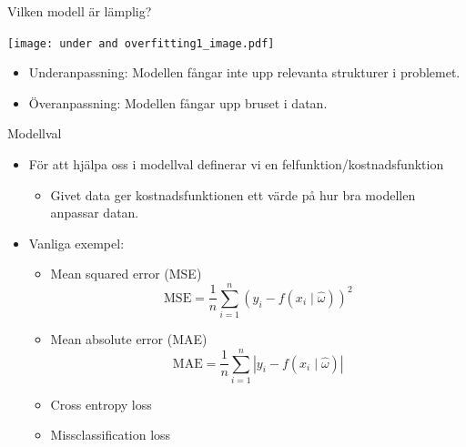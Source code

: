\documentclass[10pt,english]{beamer}
\begin{document}
\begin{frame}{Vilken modell är lämplig?}
    \begin{center}
        \texttt{[image: under and overfitting1\_image.pdf]}
    \end{center}

    \begin{itemize}
        \item Underanpassning: Modellen fångar inte upp relevanta strukturer i problemet.
        \item Överanpassning: Modellen fångar upp bruset i datan.
    \end{itemize}

\end{frame}

\begin{frame}{Modellval}
    \begin{itemize}
        \item För att hjälpa oss i modellval definerar vi en felfunktion/kostnadsfunktion
        \begin{itemize}
            \item Givet data ger kostnadsfunktionen ett värde på hur bra modellen anpassar datan.
        \end{itemize}
        \item Vanliga exempel:
        \begin{itemize}
            \item Mean squared error (MSE)
            \begin{equation*}
                \text{MSE} = \frac{1}{n} \sum_{i=1}^{n} \left(y_i - f(x_i \mid \hat{\omega})\right)^2
            \end{equation*}
            \item Mean absolute error (MAE)
            \begin{equation*}
                \text{MAE} = \frac{1}{n} \sum_{i=1}^{n} \left| y_i - f(x_i \mid \hat{\omega}) \right|
            \end{equation*}
            \item Cross entropy loss
            \item Missclassification loss
        \end{itemize}
    \end{itemize}
\end{frame}
\end{document}
